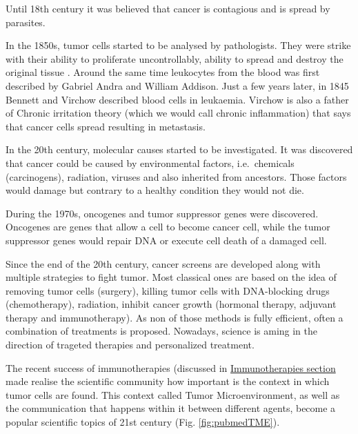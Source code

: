 \documentclass[12pt,]{book}
\theoremstyle{definition}
\theoremstyle{definition}
\theoremstyle{definition}
\theoremstyle{remark}
\begin{document}
Until 18th century it was believed that cancer is contagious and is
spread by parasites.

In the 1850s, tumor cells started to be analysed by pathologists. They
were strike with their ability to proliferate uncontrollably, ability to
spread and destroy the original tissue \citep[ ]{NPR2010}. Around the
same time leukocytes from the blood was first described by Gabriel Andra
and William Addison. Just a few years later, in 1845 Bennett and Virchow
described blood cells in leukaemia. Virchow is also a father of Chronic
irritation theory (which we would call chronic inflammation) that says
that cancer cells spread resulting in metastasis.

In the 20th century, molecular causes started to be investigated. It was
discovered that cancer could be caused by environmental factors,
i.e.~chemicals (carcinogens), radiation, viruses and also inherited from
ancestors. Those factors would damage but contrary to a healthy
condition they would not die.

During the 1970s, oncogenes and tumor suppressor genes were discovered.
Oncogenes are genes that allow a cell to become cancer cell, while the
tumor suppressor genes would repair DNA or execute cell death of a
damaged cell.

Since the end of the 20th century, cancer screens are developed along
with multiple strategies to fight tumor. Most classical ones are based
on the idea of removing tumor cells (surgery), killing tumor cells with
DNA-blocking drugs (chemotherapy), radiation, inhibit cancer growth
(hormonal therapy, adjuvant therapy and immunotherapy). As non of those
methods is fully efficient, often a combination of treatments is
proposed. Nowadays, science is aming in the direction of trageted
therapies and personalized treatment.

The recent success of immunotherapies (discussed in
\protect\hyperlink{immunotherapies}{Immunotherapies section} made
realise the scientific community how important is the context in which
tumor cells are found. This context called Tumor Microenvironment, as
well as the communication that happens within it between different
agents, become a popular scientific topics of 21st century (Fig.
\ref{fig:pubmedTME}).
\end{document}
